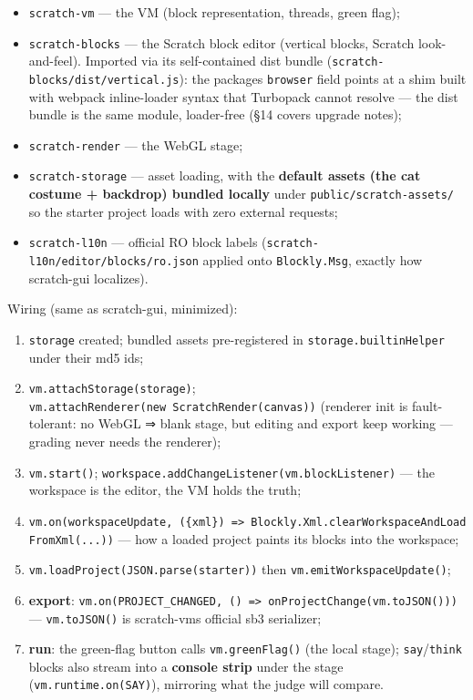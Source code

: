 \documentclass[
]{article}
\providecommand{\tightlist}{%
  \setlength{\itemsep}{0pt}\setlength{\parskip}{0pt}}
\begin{document}
\begin{itemize}
\tightlist
\item
  \texttt{scratch-vm} --- the VM (block representation, threads, green
  flag);
\item
  \texttt{scratch-blocks} --- the Scratch block editor (vertical blocks,
  Scratch look-and-feel). Imported via its self-contained dist bundle
  (\texttt{scratch-blocks/dist/vertical.js}): the
  package\textquotesingle s \texttt{browser} field points at a shim
  built with webpack inline-loader syntax that Turbopack cannot resolve
  --- the dist bundle is the same module, loader-free (§14 covers
  upgrade notes);
\item
  \texttt{scratch-render} --- the WebGL stage;
\item
  \texttt{scratch-storage} --- asset loading, with the \textbf{default
  assets (the cat costume + backdrop) bundled locally} under
  \texttt{public/scratch-assets/} so the starter project loads with zero
  external requests;
\item
  \texttt{scratch-l10n} --- official RO block labels
  (\texttt{scratch-l10n/editor/blocks/ro.json} applied onto
  \texttt{Blockly.Msg}, exactly how scratch-gui localizes).
\end{itemize}

Wiring (same as scratch-gui, minimized):

\begin{enumerate}
\def\labelenumi{\arabic{enumi}.}
\tightlist
\item
  \texttt{storage} created; bundled assets pre-registered in
  \texttt{storage.builtinHelper} under their md5 ids;
\item
  \texttt{vm.attachStorage(storage)};
  \texttt{vm.attachRenderer(new\ ScratchRender(canvas))} (renderer init
  is fault-tolerant: no WebGL ⇒ blank stage, but editing and export keep
  working --- grading never needs the renderer);
\item
  \texttt{vm.start()};
  \texttt{workspace.addChangeListener(vm.blockListener)} --- the
  workspace is the editor, the VM holds the truth;
\item
  \texttt{vm.on(\textquotesingle{}workspaceUpdate\textquotesingle{},\ (\{xml\})\ =\textgreater{}\ Blockly.Xml.clearWorkspaceAndLoadFromXml(...))}
  --- how a loaded project paints its blocks into the workspace;
\item
  \texttt{vm.loadProject(JSON.parse(starter))} then
  \texttt{vm.emitWorkspaceUpdate()};
\item
  \textbf{export}:
  \texttt{vm.on(\textquotesingle{}PROJECT\_CHANGED\textquotesingle{},\ ()\ =\textgreater{}\ onProjectChange(vm.toJSON()))}
  --- \texttt{vm.toJSON()} is scratch-vm\textquotesingle s official sb3
  serializer;
\item
  \textbf{run}: the green-flag button calls \texttt{vm.greenFlag()} (the
  local stage); \texttt{say}/\texttt{think} blocks also stream into a
  \textbf{console strip} under the stage
  (\texttt{vm.runtime.on(\textquotesingle{}SAY\textquotesingle{})}),
  mirroring what the judge will compare.
\end{enumerate}
\end{document}

